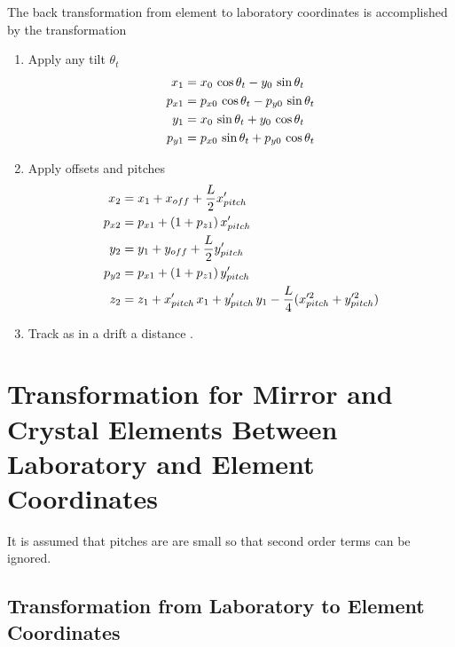 The back transformation from element to laboratory coordinates is
accomplished by the transformation
\begin{enumerate}
\item
Apply any tilt $\theta_t$
\begin{align}
  x_1    &=  x_0    \, \cos\theta_t - y_0    \, \sin\theta_t \nonumber \\
  p_{x1} &=  p_{x0} \, \cos\theta_t - p_{y0} \, \sin\theta_t \nonumber \\
  y_1    &=  x_0    \, \sin\theta_t + y_0    \, \cos\theta_t \\
  p_{y1} &=  p_{x0} \, \sin\theta_t + p_{y0} \, \cos\theta_t \nonumber
\end{align}
\item
Apply offsets and pitches
\begin{align}
  x_2    &= x_1 + x_{off} + \frac{L}{2} x'_{pitch}     \nonumber \\
  p_{x2} &= p_{x1} + (1 + p_{z1}) \, x'_{pitch}        \nonumber \\
  y_2    &= y_1 + y_{off} + \frac{L}{2} y'_{pitch}     \\
  p_{y2} &= p_{x1} + (1 + p_{z1}) \, y'_{pitch}        \nonumber \\
  z_2    &= z_1 + x'_{pitch} \, x_1 + y'_{pitch} \, y_1 - 
    \frac{L}{4} (x^{\prime2}_{pitch} + y^{\prime2}_{pitch})      \nonumber
\end{align}
\item
Track as in a drift a distance .
\end{enumerate}


\section[Mirror and Crystal Elements]{Transformation for Mirror and Crystal Elements Between 
Laboratory and Element Coordinates}
\label{s:photon-lab-ele}

It is assumed that pitches are are small so that second
order terms can be ignored.

\subsection{Transformation from Laboratory to Element Coordinates}

